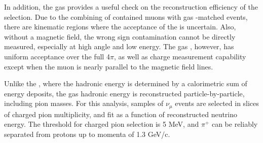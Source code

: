In addition, the gas  provides a useful check on the reconstruction efficiency of the  selection. Due to the combining of contained muons with gas -matched events, there are kinematic regions where the acceptance of the  is uncertain. Also, without a magnetic field, the wrong sign contamination cannot be directly measured, especially at high angle and low energy. The gas , however, has uniform acceptance over the full 4$\pi$, as well as charge measurement capability except when the muon is nearly parallel to the magnetic field lines.

Unlike the , where the hadronic energy is determined by a calorimetric sum of energy deposits, the gas  hadronic energy is reconstructed particle-by-particle, including pion masses. For this analysis, samples of $\nu_{\mu}$  events are selected in slices of charged pion multiplicity, and fit as a function of reconstructed neutrino energy. The threshold for charged pion selection is 5 MeV, and $\pi^{+}$ can be reliably separated from protons up to momenta of 1.3 GeV/c.


